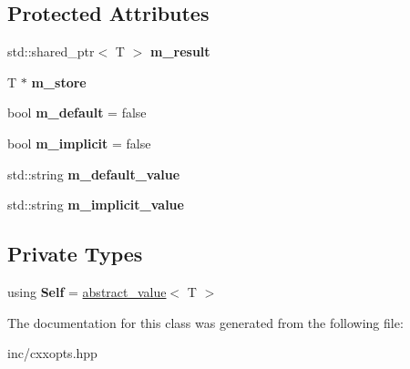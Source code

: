 \subsection*{Protected Attributes}
\begin{DoxyCompactItemize}
\item 
std\+::shared\+\_\+ptr$<$ T $>$ {\bfseries m\+\_\+result}\hypertarget{classcxxopts_1_1values_1_1abstract__value_a0df330cac57a96d7ac25dd6a666d5b94}{}\label{classcxxopts_1_1values_1_1abstract__value_a0df330cac57a96d7ac25dd6a666d5b94}

\item 
T $\ast$ {\bfseries m\+\_\+store}\hypertarget{classcxxopts_1_1values_1_1abstract__value_ab5b256909ddbb516bd46d197dadf073e}{}\label{classcxxopts_1_1values_1_1abstract__value_ab5b256909ddbb516bd46d197dadf073e}

\item 
bool {\bfseries m\+\_\+default} = false\hypertarget{classcxxopts_1_1values_1_1abstract__value_ad16dfdf6856b66c4ed6b35edfade5218}{}\label{classcxxopts_1_1values_1_1abstract__value_ad16dfdf6856b66c4ed6b35edfade5218}

\item 
bool {\bfseries m\+\_\+implicit} = false\hypertarget{classcxxopts_1_1values_1_1abstract__value_a3f9bdb2d94189ddf78eb5b338d5c33bc}{}\label{classcxxopts_1_1values_1_1abstract__value_a3f9bdb2d94189ddf78eb5b338d5c33bc}

\item 
std\+::string {\bfseries m\+\_\+default\+\_\+value}\hypertarget{classcxxopts_1_1values_1_1abstract__value_a0e3f038dc1c0aeab3e5c517d9e033ee4}{}\label{classcxxopts_1_1values_1_1abstract__value_a0e3f038dc1c0aeab3e5c517d9e033ee4}

\item 
std\+::string {\bfseries m\+\_\+implicit\+\_\+value}\hypertarget{classcxxopts_1_1values_1_1abstract__value_a69ed02e5ce2c431fad801ed5bb1cde26}{}\label{classcxxopts_1_1values_1_1abstract__value_a69ed02e5ce2c431fad801ed5bb1cde26}

\end{DoxyCompactItemize}
\subsection*{Private Types}
\begin{DoxyCompactItemize}
\item 
using {\bfseries Self} = \hyperlink{classcxxopts_1_1values_1_1abstract__value}{abstract\+\_\+value}$<$ T $>$\hypertarget{classcxxopts_1_1values_1_1abstract__value_a6b8c97ae22663547247602545e8a1cf9}{}\label{classcxxopts_1_1values_1_1abstract__value_a6b8c97ae22663547247602545e8a1cf9}

\end{DoxyCompactItemize}


The documentation for this class was generated from the following file\+:\begin{DoxyCompactItemize}
\item 
inc/cxxopts.\+hpp\end{DoxyCompactItemize}
